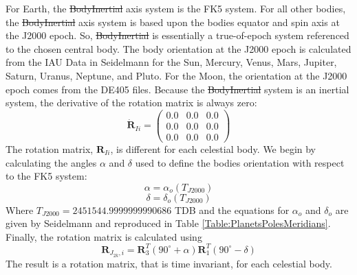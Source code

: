 {For Earth, the \st{BodyInertial} axis system is the FK5 system.  For
all other bodies, the \st{BodyInertial} axis system is based upon
the bodies equator and spin axis at the J2000 epoch. So,
\st{BodyInertial} is essentially a true-of-epoch system referenced
to the chosen central body.  The body orientation at the J2000 epoch
is calculated from the IAU Data in Seidelmann
\cite{Seidelmann:etal:02} for the Sun, Mercury, Venus, Mars,
Jupiter, Saturn, Uranus, Neptune, and Pluto.  For the Moon, the
orientation at the J2000 epoch comes from the DE405 files.  Because
the \st{BodyInertial} system is an inertial system, the derivative
of the rotation matrix is always zero:
%
\begin{equation}
   \dot{\mathbf{R}}_{Ii}  = \begin{pmatrix}
     0.0 & 0.0 & 0.0\\
     0.0 & 0.0 & 0.0\\
     0.0 & 0.0 & 0.0
     \end{pmatrix}
\end{equation}
%
The rotation matrix, $\mathbf{R}_{Ii}$, is different for each
celestial body.  We begin by calculating the angles $\alpha$ and
$\delta$ used to define the bodies orientation with respect to the
FK5 system:
%
\begin{equation}
    \alpha = \alpha_o(T_{J2000})
\end{equation}
%
\begin{equation}
    \delta = \delta_o(T_{J2000})
\end{equation}
%
Where $T_{J2000} = 2451544.9999999990686$ TDB and the equations for
$\alpha_o$ and $\delta_o$ are given by Seidelmann
\cite{Seidelmann:etal:02} and reproduced in Table
\ref{Table:PlanetsPolesMeridians}. Finally, the rotation matrix is
calculated using
%
\begin{equation}
     \mathbf{R}_{J_{2k},i} = \mathbf{R}_3^{T}(90^{\circ} + \alpha)
     \mathbf{R}_1^{T}(90^{\circ}- \delta) \label{Eq:BodyEquatorR}
\end{equation}
%
The result is a rotation matrix, that is time invariant, for each
celestial body.%
%
}
